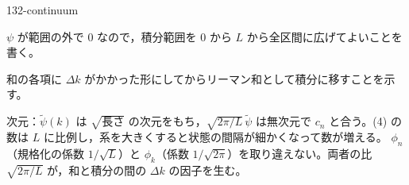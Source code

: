 \documentclass[uplatex,dvipdfmx,a4paper,11pt]{jsarticle}
\begin{document}
\begin{kaisetsu}{132-continuum}
{}
\begin{ronten}
  \item {} $\psi$ が範囲の外で $0$ なので，積分範囲を $0$ から $L$ から全区間に広げてよいことを書く。
  \item {} 和の各項に $\Delta k$ がかかった形にしてからリーマン和として積分に移すことを示す。
\end{ronten}
\kenzan 次元：$\tilde{\psi}(k)$ は $\sqrt{\text{長さ}}$ の次元をもち，$\sqrt{2\pi/L}\,\tilde{\psi}$ は無次元で $c_{n}$ と合う。(4) の数は $L$ に比例し，系を大きくすると状態の間隔が細かくなって数が増える。
\tsumazuki $\phi_{n}$（規格化の係数 $1/\sqrt{L}$）と $\phi_{k}$（係数 $1/\sqrt{2\pi}$）を取り違えない。両者の比 $\sqrt{2\pi/L}$ が，和と積分の間の $\Delta k$ の因子を生む。
\end{kaisetsu}
\end{document}
